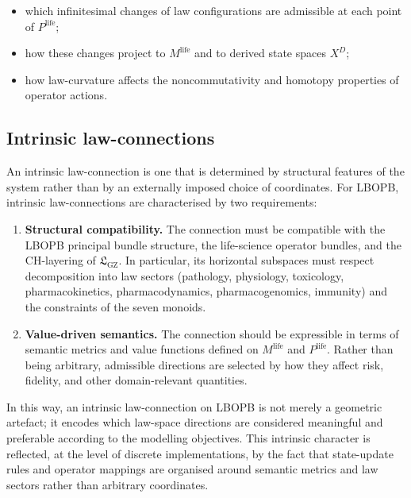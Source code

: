 \documentclass[11pt]{book}
\theoremstyle{plain}
\theoremstyle{definition}
\theoremstyle{remark}
\newcommand{\GZLS}{\ensuremath{\mathfrak{L}_{\mathrm{GZ}}}}       \newcommand{\GZLT}{\ensuremath{M_{!w}}}                           \newcommand{\GZLOC}{\ensuremath{A_M}}                             \newcommand{\GZLCurv}{\ensuremath{\mathcal{F}_{\mathrm{law}}}}
\begin{document}
\begin{itemize}
  \item which infinitesimal changes of law configurations are admissible
        at each point of $P^{\mathrm{life}}$;
  \item how these changes project to $M^{\mathrm{life}}$ and to derived
        state spaces $X^{D}$;
  \item how law-curvature affects the noncommutativity and homotopy
        properties of operator actions.
\end{itemize}

\subsection*{Intrinsic law-connections}

An intrinsic law-connection is one that is determined by structural
features of the system rather than by an externally imposed choice of
coordinates. For LBOPB, intrinsic law-connections are characterised by
two requirements:

\begin{enumerate}
  \item \textbf{Structural compatibility.}
        The connection must be compatible with the LBOPB principal
        bundle structure, the life-science operator bundles, and the
        CH-layering of $\GZLS$. In particular, its horizontal
        subspaces must respect decomposition into law sectors
        (pathology, physiology, toxicology, pharmacokinetics,
        pharmacodynamics, pharmacogenomics, immunity) and the
        constraints of the seven monoids.
  \item \textbf{Value-driven semantics.}
        The connection should be expressible in terms of semantic
        metrics and value functions defined on $M^{\mathrm{life}}$ and
        $P^{\mathrm{life}}$. Rather than being arbitrary, admissible
        directions are selected by how they affect risk, fidelity, and
        other domain-relevant quantities.
\end{enumerate}

In this way, an intrinsic law-connection on LBOPB is not merely a
geometric artefact; it encodes which law-space directions are
considered meaningful and preferable according to the modelling
objectives. This intrinsic character is reflected, at the level of
discrete implementations, by the fact that state-update rules and
operator mappings are organised around semantic metrics and law
sectors rather than arbitrary coordinates.
\end{document}
